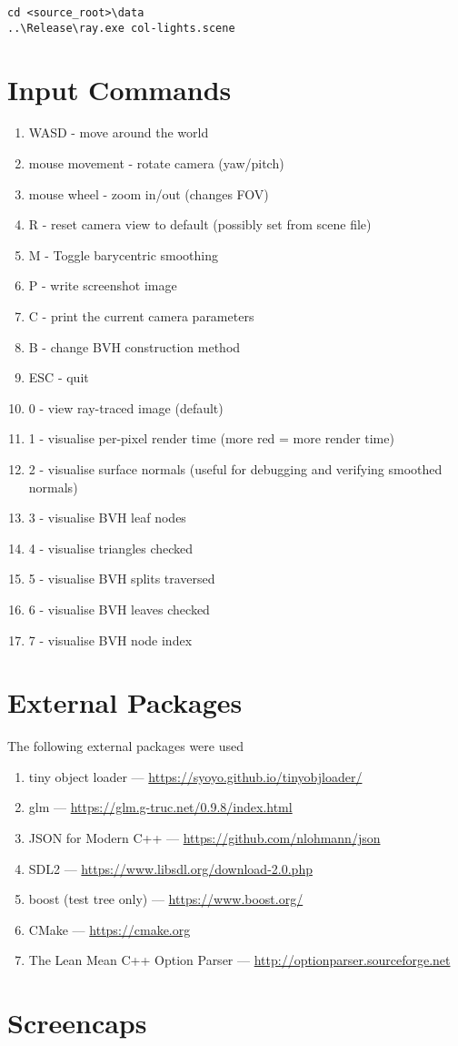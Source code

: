 \verb|cd <source_root>\data| \\
\verb|..\Release\ray.exe col-lights.scene|

\section{Input Commands}
    \begin{enumerate}
    \item WASD - move around the world
    \item mouse movement - rotate camera (yaw/pitch)
    \item mouse wheel - zoom in/out (changes FOV)
    \item R - reset camera view to default (possibly set from scene file)
    \item M - Toggle barycentric smoothing
    \item P - write screenshot image
    \item C - print the current camera parameters
    \item B - change BVH construction method
    \item ESC - quit
    \item 0 - view ray-traced image (default)
    \item 1 - visualise per-pixel render time (more red = more render time)
    \item 2 - visualise surface normals (useful for debugging and verifying smoothed normals)
    \item 3 - visualise BVH leaf nodes
    \item 4 - visualise triangles checked
    \item 5 - visualise BVH splits traversed
    \item 6 - visualise BVH leaves checked 
    \item 7 - visualise BVH node index
    \end{enumerate}

\section{External Packages}
The following external packages were used 
\begin{enumerate}
    \item tiny object loader --- \url{https://syoyo.github.io/tinyobjloader/}
    \item glm --- \url{https://glm.g-truc.net/0.9.8/index.html}
    \item JSON for Modern C++ --- \url{https://github.com/nlohmann/json}
    \item SDL2 --- \url{https://www.libsdl.org/download-2.0.php}
    \item boost (test tree only) --- \url{https://www.boost.org/}
    \item CMake --- \url{https://cmake.org}
    \item The Lean Mean C++ Option Parser --- \url{http://optionparser.sourceforge.net}
\end{enumerate}

\section{Screencaps}

